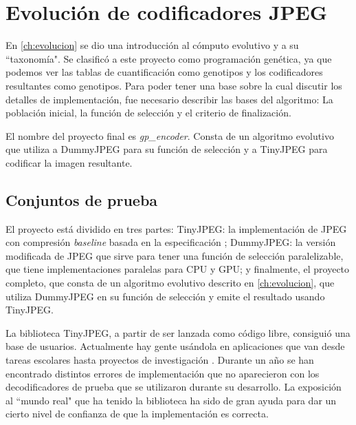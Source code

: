 
\chapter{Evolución de codificadores JPEG}\label{ch:resultados_evolucion}

En \ref{ch:evolucion} se dio una introducción al cómputo evolutivo y a su
``taxonomía". Se clasificó a este proyecto como programación genética, ya que
podemos ver las tablas de cuantificación como genotipos y los codificadores
resultantes como genotipos. Para poder tener una base sobre la cual discutir
los detalles de implementación, fue necesario describir las bases del algoritmo:
La población inicial, la función de selección y el criterio de finalización.

El nombre del proyecto final es \emph{gp\_encoder}. Consta de un algoritmo
evolutivo que utiliza a DummyJPEG para su función de selección y a TinyJPEG
para codificar la imagen resultante.

\section{Conjuntos de prueba} \label{sec:testset}

El proyecto está dividido en tres partes: TinyJPEG: la implementación de JPEG
con compresión \emph{baseline} basada en la especificación \cite{jpeg-spec};
DummyJPEG: la versión modificada de JPEG que sirve para tener una función de
selección paralelizable, que tiene implementaciones paralelas para CPU y GPU; y
finalmente, el proyecto completo, que consta de un algoritmo evolutivo descrito
en \ref{ch:evolucion}, que utiliza DummyJPEG en su función de selección y emite
el resultado usando TinyJPEG.

La biblioteca TinyJPEG, a partir de ser lanzada como código libre, consiguió
una base de usuarios. Actualmente hay gente usándola en aplicaciones que van
desde tareas escolares hasta proyectos de investigación \cite{humblebrag}.
Durante un año se han encontrado distintos errores de implementación que no
aparecieron con los decodificadores de prueba que se utilizaron durante su
desarrollo. La exposición al ``mundo real" que ha tenido la biblioteca ha sido
de gran ayuda para dar un cierto nivel de confianza de que la implementación es
correcta.

